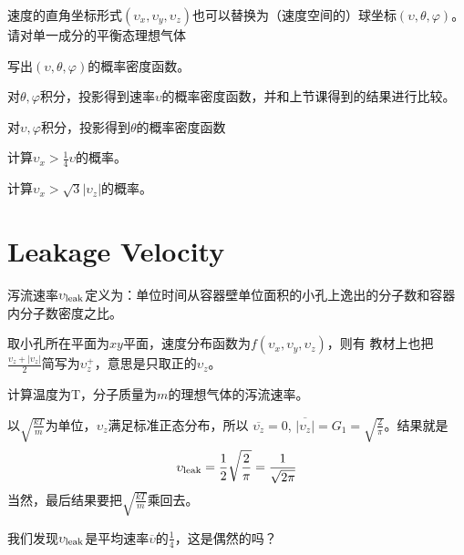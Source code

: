 \documentclass[CJK]{beamer}
\begin{document}
\begin{frame}
\bch

{\large
  速度的直角坐标形式$(\upsilon_x,\upsilon_y, \upsilon_z)$也可以替换为（速度空间的）球坐标$(\upsilon,\theta,\varphi)$。请对单一成分的平衡态理想气体
  \bitem
\item{写出$(\upsilon,\theta,\varphi)$的概率密度函数。}
\item{对$\theta,\varphi$积分，投影得到速率$\upsilon$的概率密度函数，并和上节课得到的结果进行比较。}
\item{对$\upsilon,\varphi$积分，投影得到$\theta$的概率密度函数}
\item{计算$\upsilon_x>\frac{1}{4}\upsilon$的概率。}
\item{计算$\upsilon_x> \sqrt{3} |\upsilon_z|$的概率。}  
  \eitem
}
\ech
\end{frame}




\section{Leakage Velocity}


\begin{frame}
\bch
{\large
  泻流速率$\upsilon_{\rm leak}$定义为：{\blue 单位时间从容器壁单位面积的小孔上逸出的分子数和容器内分子数密度之比。}

  \skipline
  
  取小孔所在平面为$xy$平面，速度分布函数为$f(\upsilon_x,\upsilon_y,\upsilon_z)$，则有
  教材上也把$\frac{\upsilon_z + |\upsilon_z|}{2}$简写为$\upsilon_z^+$，意思是只取正的$\upsilon_z$。
 
}

\ech
\end{frame}



\begin{frame}
\bch


{\large
  计算温度为T，分子质量为$m$的理想气体的泻流速率。
}

\ech
\end{frame}


\begin{frame}
\bch
{\large
以$\sqrt{\frac{kT}{m}}$为单位，$\upsilon_z$满足标准正态分布，所以
$\overline{\upsilon_z} = 0$, $\overline{|\upsilon_z|} = G_1 = \sqrt{\frac{2}{\pi}}$。结果就是
$$\upsilon_{\rm leak} = \frac{1}{2}\sqrt{\frac{2}{\pi}} = \frac{1}{\sqrt{2\pi}} $$
当然，最后结果要把$\sqrt{\frac{kT}{m}}$乘回去。

\skipline

我们发现$\upsilon_{\rm leak}$是平均速率$\overline{\upsilon}$的$\frac{1}{4}$，这是偶然的吗？}
\ech
\end{frame}
\end{document}
